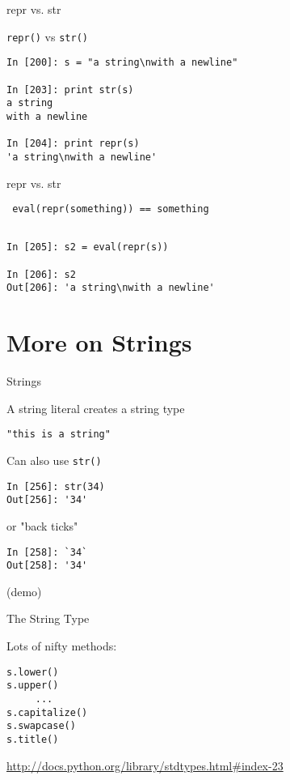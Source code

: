 \documentclass{beamer}
\begin{document}
\begin{frame}[fragile]{repr vs. str}

{\Large \verb|repr()| vs \verb|str()| }

\begin{verbatim}
In [200]: s = "a string\nwith a newline"

In [203]: print str(s)
a string
with a newline

In [204]: print repr(s)
'a string\nwith a newline'

\end{verbatim}

\end{frame}

\begin{frame}[fragile]{repr vs. str}

{\Large \verb| eval(repr(something)) == something | }

\begin{verbatim}

In [205]: s2 = eval(repr(s))

In [206]: s2
Out[206]: 'a string\nwith a newline'
\end{verbatim}

\end{frame}


\section{More on Strings}

\begin{frame}[fragile]{Strings}

{\Large A string literal creates a string type}

\begin{verbatim}
"this is a string"
\end{verbatim}

{\Large Can also use \verb|str()|}

\begin{verbatim}
In [256]: str(34)
Out[256]: '34'
\end{verbatim}
{\Large or "back ticks"}
\begin{verbatim}
In [258]: `34`
Out[258]: '34'
\end{verbatim}
(demo)
\end{frame} 

\begin{frame}[fragile]{The String Type}

{\Large Lots of nifty methods:}

\begin{verbatim}
s.lower()
s.upper()
     ...
s.capitalize()
s.swapcase()
s.title()
\end{verbatim}

\url{http://docs.python.org/library/stdtypes.html#index-23}

\end{frame} 
\end{document}
